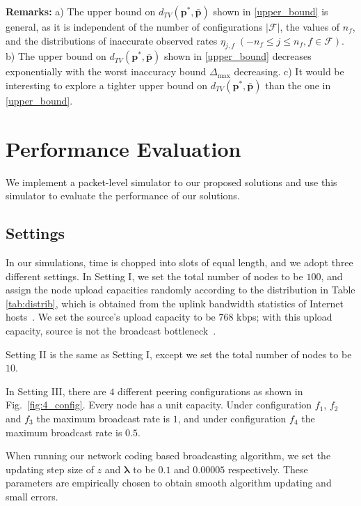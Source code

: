 \documentclass[10pt,conference]{IEEEtran}
\begin{document}
\textbf{Remarks:} a) The upper bound on
$d_{TV}(\boldsymbol{p^{*}},\boldsymbol{\bar{p}})$ shown in
\eqref{upper_bound} is general, as it is independent of the number
of configurations $|\mathcal{F}|$, the values of $n_{f}$, and the
distributions of inaccurate observed rates
$\eta_{j,f}\;\left(-n_{f}\leq j\leq n_{f},f\in\mathcal{F}\right)$.
b) The upper bound on
$d_{TV}(\boldsymbol{p^{*}},\boldsymbol{\bar{p}})$ shown in
\eqref{upper_bound} decreases exponentially with the worst
inaccuracy bound $\Delta_{\max}$ decreasing. c) It would be
interesting to explore a tighter upper bound on
$d_{TV}(\boldsymbol{p^{*}},\boldsymbol{\bar{p}})$ than the one in
\eqref{upper_bound}.

\section{Performance Evaluation}

\label{sec:simu}

We implement a packet-level simulator to our proposed solutions and use this simulator to evaluate the performance of our solutions.


\subsection{Settings}

In our simulations, time is chopped into slots of equal length, and we adopt three different settings. In Setting I, we set the total number of nodes to be $100$, and assign the node upload capacities randomly according to the distribution
in Table \ref{tab:distrib}, which is obtained from the uplink bandwidth statistics of Internet hosts~\cite{vodprofitable}. We set the source's upload capacity to be $768$ kbps; with this upload capacity, source is not the broadcast bottleneck~\cite{all:Mutualcast:LPZ05,all:P2PStreaming:KLR.07}.

Setting II is the same as Setting I, except we set the total number of nodes to be $10$.

In Setting III, there are $4$ different peering configurations as shown in Fig.~\ref{fig:4_config}. Every node has a unit capacity. Under configuration $f_1$, $f_2$ and $f_3$ the maximum broadcast rate is $1$, and under configuration $f_4$ the maximum broadcast rate is $0.5$.

When running our network coding based broadcasting algorithm, we set the updating step size of $z$ and $\boldsymbol{\lambda}$ to be $0.1$ and $0.00005$ respectively. These parameters are empirically chosen to obtain smooth algorithm updating and small errors.
\end{document}
